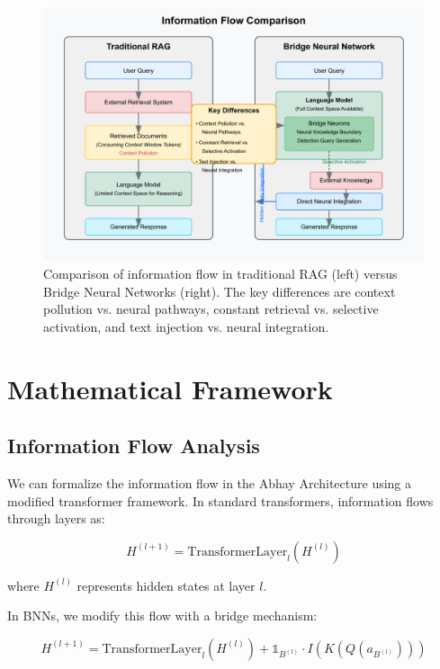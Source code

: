 \documentclass[9pt,a4paper,twocolumn,twoside]{tau-class/tau}
\begin{document}
    \begin{figure}[h]
        \centering
        \includegraphics[width=\columnwidth]{figures/figure2_information_flow_comparison.pdf}
        \caption{Comparison of information flow in traditional RAG (left) versus Bridge Neural Networks (right). The key differences are context pollution vs. neural pathways, constant retrieval vs. selective activation, and text injection vs. neural integration.}
        \label{fig:comparison}
    \end{figure}

\section{Mathematical Framework}

\subsection{Information Flow Analysis}

    We can formalize the information flow in the Abhay Architecture using a modified transformer framework. In standard transformers, information flows through layers as:

    \begin{equation}
    H^{(l+1)} = \text{TransformerLayer}_l(H^{(l)})
    \end{equation}

    where $H^{(l)}$ represents hidden states at layer $l$. 

    In BNNs, we modify this flow with a bridge mechanism:

    \begin{equation}
    H^{(l+1)} = \text{TransformerLayer}_l(H^{(l)}) + \mathbb{1}_{B^{(l)}} \cdot I(K(Q(a_{B^{(l)}})))
    \end{equation}
\end{document}
